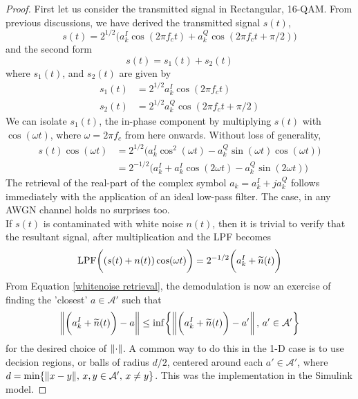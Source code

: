 \documentclass[../../main.tex]{subfiles}
\begin{document}
\begin{proof}
    First let us consider the transmitted signal in Rectangular, 16-QAM. From previous discussions, we have derived the transmitted signal $s(t)$,
    \begin{equation}\label{s(t) form 1} 
    s(t) = 2^{1/2}\biggl(a^I_k\cos(2\pi f_c t)+a^Q_k\cos(2\pi f_c t + \pi/2)\biggr)
    \end{equation}
    and the second form
    \begin{equation}\label{s(t) form 2} 
    s(t) = s_1(t) + s_2(t)
    \end{equation}
    where $s_1(t)$, and $s_2(t)$ are given by
    \begin{align}
        s_1(t) &= 2^{1/2}a_k^I\cos(2\pi f_c t)\label{s_1 equation}\\
        s_2(t) &= 2^{1/2}a_k^Q\cos(2\pi f_c t +\pi/2)\label{s_2 equation}
    \end{align}
    We can isolate $s_1(t)$, the in-phase component by multiplying $s(t)$ with $\cos(\omega t)$, where $\omega = 2\pi f_c$ from here onwards. Without loss of generality,
    \begin{align*}
        s(t)\cos(\omega t)&=2^{1/2}\biggl(a_k^I\cos^2(\omega t) - a_k^Q\sin(\omega t)\cos(\omega t)\biggr)\\
        &=2^{-1/2}\biggl(a_k^I+a_k^I\cos(2\omega t)-a_k^Q\sin(2\omega t)\biggr)
    \end{align*}
    The retrieval of the real-part of the complex symbol $a_k = a_k^I + ja_k^Q$ follows immediately with the application of an ideal low-pass filter. The case, in any AWGN channel holds no surprises too.\\
    
    If $s(t)$ is contaminated with white noise $n(t)$, then it is trivial to verify that the resultant signal, after multiplication and the LPF becomes
    \begin{equation}\label{whitenoise retrieval}
        \operatorname{LPF}\biggl((s(t)+n(t))\cos(\omega t)\biggr)=2^{-1/2}\biggl(a_k^I + \widetilde{n}(t)\biggr)
    \end{equation}
    From Equation \eqref{whitenoise retrieval}, the demodulation is now an exercise of finding the 'closest' $a\in\mathcal{A}'$ such that
    \[
    \left\lVert {\biggl(a_k^I + \widetilde{n}(t)\biggr)-a} \right\rVert\leq\inf\biggl\{\left\lVert {\biggl(a_k^I + \widetilde{n}(t)\biggr)-a'} \right\rVert,\,a'\in\mathcal{A}'\biggr\}
    \]
    for the desired choice of $\lVert {\cdot} \rVert$. A common way to do this in the 1-D case is to use decision regions, or balls of radius $d/2$, centered around each $a'\in\mathcal{A}'$, where $d = \min\{\lVert {x-y} \rVert,\,x,y\in\mathcal{A}',\,x\neq y\}$. This was the implementation in the Simulink model.
\end{proof}
\end{document}
